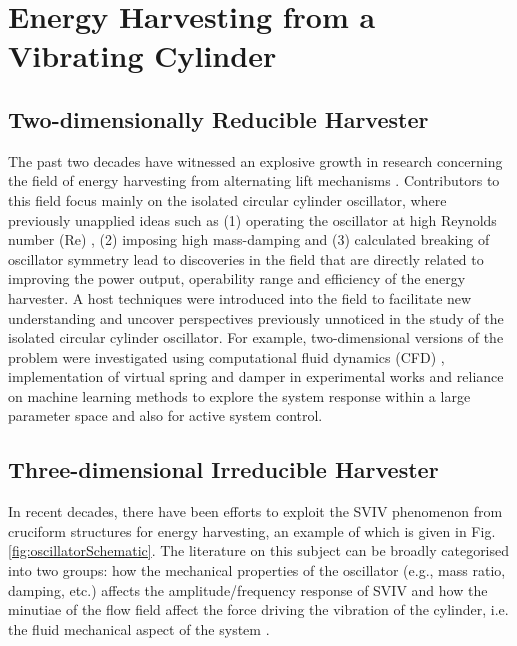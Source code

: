 \documentclass[oneside]{utmthesis}
\begin{document}
\section{Energy Harvesting from a Vibrating Cylinder}
\subsection{Two-dimensionally Reducible Harvester}
The past two decades have witnessed an explosive growth in research concerning the field of energy harvesting from alternating lift mechanisms \citep{Ding2019,Xu2017,Sun2019b}. Contributors to this field focus mainly on the isolated circular cylinder oscillator, where previously unapplied ideas such as (1) operating the oscillator at high Reynolds number (Re) \citep{Bernitsas2008a,Bernitsas2009}, (2) imposing high mass-damping \citep{Lee2011a,Lee2011b,Sun2016} and (3) calculated breaking of oscillator symmetry \citep{Ding2015a,Ding2015b,Ding2017} lead to discoveries in the field that are directly related to improving the power output, operability range and efficiency of the energy harvester. A host techniques were introduced into the field to facilitate new understanding and uncover perspectives previously unnoticed in the study of the isolated circular cylinder oscillator. For example, two-dimensional versions of the problem were investigated using computational fluid dynamics (CFD) \citep{Wu2011c,Zhang2018a}, implementation of virtual spring and damper in experimental works \citep{Garcia2018,Sun2018} and reliance on machine learning methods to explore the system response within a large parameter space \citep{Wu2018,Ren2019,Raissi2019,Hu2020} and also for active system control.

\subsection{Three-dimensional Irreducible Harvester}
In recent decades, there have been efforts to exploit the SVIV phenomenon from cruciform structures for energy harvesting, an example of which is given in Fig. \ref{fig:oscillatorSchematic}. The literature on this subject can be broadly categorised into two groups: how the mechanical properties of the oscillator (e.g., mass ratio, damping, etc.) affects the amplitude/frequency response of SVIV \citep{Koide2009,Koide2013,Nguyen2012} and how the minutiae of the flow field affect the force driving the vibration of the cylinder, i.e. the fluid mechanical aspect of the system \citep{Deng2007,Koide2017,Zhao2018a}.
\end{document}
